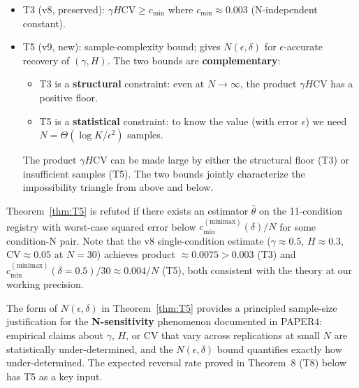 \begin{remark}[Significance: T5 vs T3]
\begin{itemize}[nosep]
  \item T3 (v8, preserved): $\gamma H \mathrm{CV} \ge c_{\min}$ where
        $c_{\min} \approx 0.003$ (N-independent constant).
  \item T5 (v9, new): sample-complexity bound; gives $N(\epsilon, \delta)$
        for $\epsilon$-accurate recovery of $(\gamma, H)$. The two bounds
        are \textbf{complementary}:
        \begin{itemize}[nosep,label=$\bullet$]
          \item T3 is a \textbf{structural} constraint: even at $N \to \infty$,
                the product $\gamma H \mathrm{CV}$ has a positive floor.
          \item T5 is a \textbf{statistical} constraint: to know the value
                (with error $\epsilon$) we need $N = \Theta(\log K / \epsilon^2)$
                samples.
        \end{itemize}
        The product $\gamma H \mathrm{CV}$ can be made large by either the
        structural floor (T3) or insufficient samples (T5). The two bounds
        jointly characterize the impossibility triangle from above and below.
\end{itemize}
\end{remark}

\begin{remark}
\label{rem:T5_falsification}
Theorem~\ref{thm:T5} is refuted if there exists an estimator $\hat\theta$ on
the 11-condition registry with worst-case squared error below
$c_{\min}^{(\mathrm{minimax})}(\delta) / N$ for some condition-N pair. Note
that the v8 single-condition estimate ($\gamma \approx 0.5$, $H \approx 0.3$,
$\mathrm{CV} \approx 0.05$ at $N=30$) achieves product $\approx 0.0075 > 0.003$
(T3) and $c_{\min}^{(\mathrm{minimax})}(\delta=0.5)/30 \approx 0.004/N$
(T5), both consistent with the theory at our working precision.
\end{remark}

\begin{remark}
The form of $N(\epsilon, \delta)$ in Theorem~\ref{thm:T5} provides a
principled sample-size justification for the \textbf{N-sensitivity} phenomenon
documented in PAPER4: empirical claims about $\gamma$, $H$, or CV that vary
across replications at small $N$ are statistically under-determined, and the
$N(\epsilon, \delta)$ bound quantifies exactly how under-determined. The
expected reversal rate proved in Theorem~8 (T8) below has T5 as a key input.
\end{remark}

